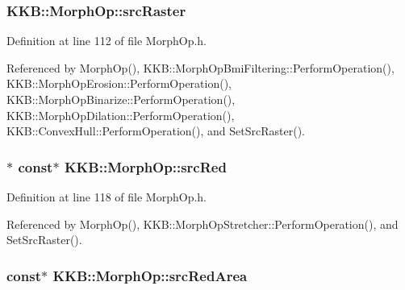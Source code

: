 \subsubsection[{\texorpdfstring{src\+Raster}{srcRaster}}]{ K\+K\+B\+::\+Morph\+Op\+::src\+Raster\hspace{0.3cm}{\ttfamily [protected]}}\hypertarget{class_k_k_b_1_1_morph_op_a9af0ebff0135d124c7d1d17e21c4d7e6}{}\label{class_k_k_b_1_1_morph_op_a9af0ebff0135d124c7d1d17e21c4d7e6}


Definition at line 112 of file Morph\+Op.\+h.



Referenced by Morph\+Op(), K\+K\+B\+::\+Morph\+Op\+Bmi\+Filtering\+::\+Perform\+Operation(), K\+K\+B\+::\+Morph\+Op\+Erosion\+::\+Perform\+Operation(), K\+K\+B\+::\+Morph\+Op\+Binarize\+::\+Perform\+Operation(), K\+K\+B\+::\+Morph\+Op\+Dilation\+::\+Perform\+Operation(), K\+K\+B\+::\+Convex\+Hull\+::\+Perform\+Operation(), and Set\+Src\+Raster().

\subsubsection[{\texorpdfstring{src\+Red}{srcRed}}]{$\ast$ const$\ast$ K\+K\+B\+::\+Morph\+Op\+::src\+Red\hspace{0.3cm}{\ttfamily [protected]}}\hypertarget{class_k_k_b_1_1_morph_op_a4d790e4b71cfdaecee876879663dfdb4}{}\label{class_k_k_b_1_1_morph_op_a4d790e4b71cfdaecee876879663dfdb4}


Definition at line 118 of file Morph\+Op.\+h.



Referenced by Morph\+Op(), K\+K\+B\+::\+Morph\+Op\+Stretcher\+::\+Perform\+Operation(), and Set\+Src\+Raster().

\subsubsection[{\texorpdfstring{src\+Red\+Area}{srcRedArea}}]{ const$\ast$ K\+K\+B\+::\+Morph\+Op\+::src\+Red\+Area\hspace{0.3cm}{\ttfamily [protected]}}\hypertarget{class_k_k_b_1_1_morph_op_acd1f255803231ecfabc0609685e56abe}{}\label{class_k_k_b_1_1_morph_op_acd1f255803231ecfabc0609685e56abe}


